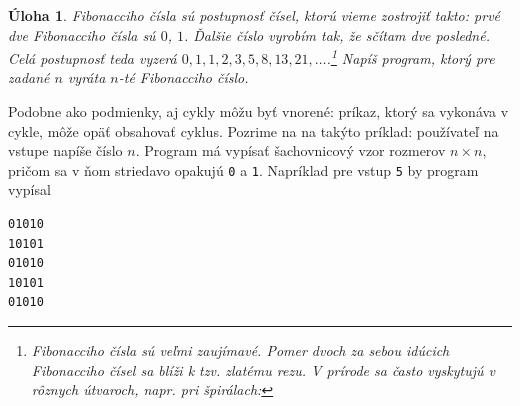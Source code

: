 \documentclass[10pt]{article}
\def\prg{\lstinline}
\def\ods{\vspace*{10pt}}
\newtheorem{uloha}{Úloha}
\begin{document}
\begin{uloha}
  \label{uloha:Fibonacci}
  Fibonacciho čísla sú postupnosť čísel, ktorú vieme zostrojiť takto: prvé dve
  Fibonacciho čísla sú $0$, $1$. Ďalšie číslo vyrobím tak, že sčítam dve posledné.
  Celá postupnosť teda vyzerá $0,1,1,2,3,5,8,13,21,\ldots$.\footnote{%
   Fibonacciho čísla sú veľmi zaujímavé. Pomer dvoch za sebou idúcich Fibonacciho
   čísel sa blíži k
   tzv. {\em zlatému rezu}. V prírode sa často vyskytujú v rôznych útvaroch, 
   napr. pri špirálach:\newline\newline

    }
    Napíš program, ktorý pre zadané $n$ vyráta $n$-té Fibonacciho číslo.

\end{uloha}

\ods
Podobne ako podmienky, aj cykly môžu byť vnorené: príkaz, ktorý sa vykonáva v cykle,
môže opäť obsahovať cyklus. Pozrime na na takýto príklad: používateľ na vstupe napíše číslo
$n$. Program má vypísať šachovnicový vzor rozmerov $n\times n$, pričom sa v ňom
striedavo opakujú \prg!0!
a \prg!1!. Napríklad pre vstup \prg!5! by program vypísal

\begin{verbatim}
01010
10101
01010
10101
01010
\end{verbatim}
\end{document}
